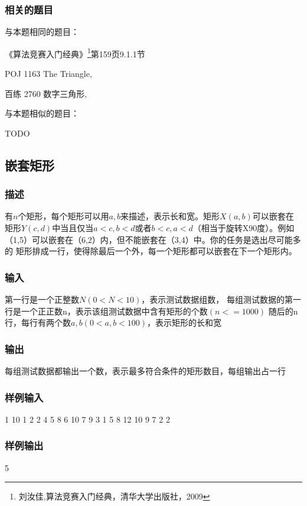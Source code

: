 \subsubsection{相关的题目}
与本题相同的题目：
\begindot
\item 《算法竞赛入门经典》\footnote{刘汝佳,算法竞赛入门经典，清华大学出版社，2009}第159页9.1.1节
\item POJ 1163 The Triangle, 
\item 百练 2760 数字三角形, 
\myenddot

与本题相似的题目：
\begindot
\item  TODO
\myenddot

\subsection{嵌套矩形}

\subsubsection{描述}
有$n$个矩形，每个矩形可以用$a,b$来描述，表示长和宽。矩形$X(a,b)$可以嵌套在
矩形$Y(c,d)$中当且仅当$a<c,b<d$或者$b<c,a<d$（相当于旋转X90度）。例如
（1,5）可以嵌套在（6,2）内，但不能嵌套在（3,4）中。你的任务是选出尽可能多的
矩形排成一行，使得除最后一个外，每一个矩形都可以嵌套在下一个矩形内。

\subsubsection{输入}
第一行是一个正整数$N(0<N<10)$，表示测试数据组数，
每组测试数据的第一行是一个正正数n，表示该组测试数据中含有矩形的个数$(n<=1000)$
随后的n行，每行有两个数$a,b(0<a,b<100)$，表示矩形的长和宽

\subsubsection{输出}
每组测试数据都输出一个数，表示最多符合条件的矩形数目，每组输出占一行

\subsubsection{样例输入}
\begin{Code}
1
10
1 2
2 4
5 8
6 10
7 9
3 1
5 8
12 10
9 7
2 2
\end{Code}

\subsubsection{样例输出}
\begin{Code}
5
\end{Code}

